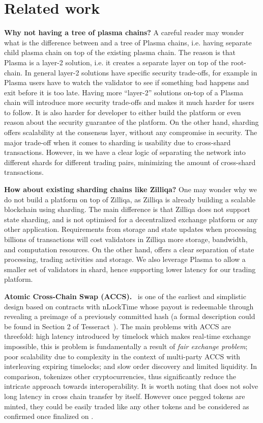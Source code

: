 \section{Related work}
\textbf{Why not having a tree of plasma chains?} A careful reader may wonder what is the difference between \codename and a tree of Plasma chains, i.e. having separate child plasma chain on top of the existing plasma chain. The reason is that Plasma is a layer-2 solution, i.e. it creates a separate layer on top of the root-chain. In general layer-2 solutions have specific security trade-offs, for example in Plasma users have to watch the validator to see if something bad happens and exit before it is too late. Having more ``layer-2” solutions on-top of a Plasma chain will introduce more security trade-offs and makes it much harder for users to follow. It is also harder for developer to either build the platform or even reason about the security guarantee of the platform. On the other hand, sharding offers scalability at the consensus layer, without any compromise in security. The major trade-off when it comes to sharding is usability due to cross-shard transactions. However, in \codename we have a clear logic of separating the network into different shards for different trading pairs, minimizing the amount of cross-shard transactions.

\textbf{How about existing sharding chains like Zilliqa?} One may wonder why we do not build a platform on top of Zilliqa, as Zilliqa is already building a scalable blockchain using sharding. The main difference is that Zilliqa does not support state sharding, and is not optimised for a decentralized exchange platform or any other application. Requirements from storage and state updates when processing billions of transactions will cost validators in Zilliqa more storage, bandwidth, and computation resources. On the other hand, \codename offers a clear separation of state processing, trading activities and storage. We also leverage Plasma to allow a smaller set of validators in shard, hence supporting lower latency for our trading platform.

\textbf{Atomic Cross-Chain Swap (ACCS).}~\cite{atomic-swap-wiki} is one of the earliest and simplistic design based on contracts with nLockTime whose payout is redeemable through revealing a preimage of a previously committed hash (a formal description could be found in Section 2 of Tesseract~\cite{tesseract}). The main problems with ACCS are threefold: high latency introduced by timelock which makes real-time exchange impossible, this is problem is fundamentally a result of \textit{fair exchange problem}\cite{fair-exchange-impossibility}; poor scalability due to complexity in the context of multi-party ACCS with interleaving expiring timelocks; and slow order discovery and limited liquidity. In comparison, \codename tokenizes other cryptocurrencies, thus significantly reduce the intricate approach towards interoperability. It is worth noting that \codename does not solve long latency in cross chain transfer by itself. However once pegged tokens are minted, they could be easily traded like any other tokens and be considered as confirmed once finalized on \codename.

